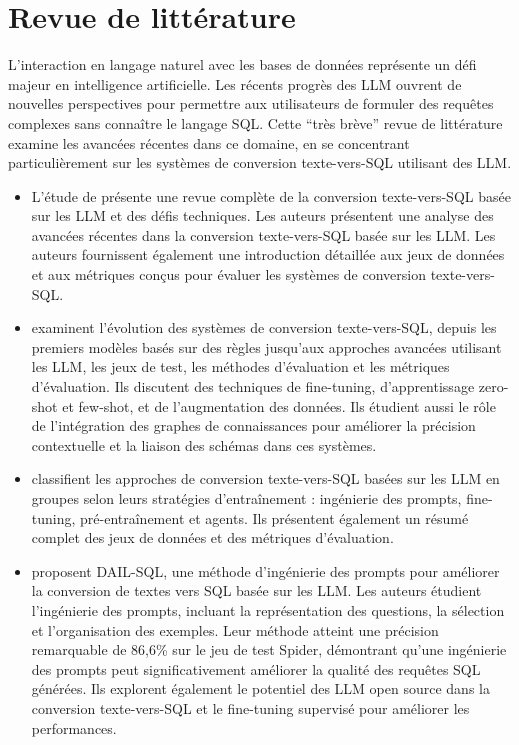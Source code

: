 \documentclass[a4paper,11pt]{article}
\begin{document}
\section{Revue de littérature}
\label{sec:revue}

L'interaction en langage naturel avec les bases de données représente un défi majeur en intelligence artificielle. Les récents progrès des LLM ouvrent de nouvelles perspectives pour permettre aux utilisateurs de formuler des requêtes complexes sans connaître le langage SQL. Cette \enquote{très brève} 
revue de littérature examine les avancées récentes dans ce domaine, en se concentrant particulièrement sur les systèmes de conversion texte-vers-SQL utilisant des LLM.

\begin{itemize}
    \item L'étude de \citet{hong2024next} présente une revue complète de la conversion texte-vers-SQL basée sur les LLM et des défis techniques. Les auteurs présentent 
    une analyse des avancées récentes dans la conversion texte-vers-SQL basée sur les LLM.
    Les auteurs 
    fournissent également une introduction détaillée aux jeux de données
    et aux métriques conçus pour évaluer les systèmes de conversion texte-vers-SQL. 

    \item \citet{mohammadjafari2024natural} examinent l'évolution des systèmes de conversion texte-vers-SQL, 
    depuis les premiers modèles basés sur des règles jusqu'aux approches avancées utilisant les LLM, les jeux de test, les méthodes d'évaluation et les métriques d'évaluation. 
    Ils discutent des techniques de fine-tuning, d'apprentissage zero-shot et few-shot, et de l'augmentation des données.
    Ils étudient aussi le rôle de l'intégration des graphes de connaissances pour améliorer la précision contextuelle et la liaison des schémas dans ces systèmes. 

    \item \citet{zhu2024large} classifient les approches de conversion texte-vers-SQL basées sur les LLM en groupes selon leurs stratégies d'entraînement : ingénierie des prompts, fine-tuning, pré-entraînement et agents. Ils présentent également un résumé complet des jeux de données et des métriques d'évaluation. 
    
    \item \citet{gao2023text} proposent DAIL-SQL, une méthode d'ingénierie des prompts pour améliorer la conversion de textes vers SQL basée sur les LLM. 
    Les auteurs étudient l'ingénierie des prompts, incluant la représentation des questions, la sélection et l'organisation des exemples. 
    Leur méthode atteint une précision remarquable de 86,6\% sur le jeu de test Spider, démontrant qu'une ingénierie des prompts peut significativement améliorer la qualité des requêtes SQL générées. Ils explorent également le potentiel des LLM open source dans la conversion texte-vers-SQL et le fine-tuning supervisé pour améliorer les performances. 


\end{itemize}
\end{document}
